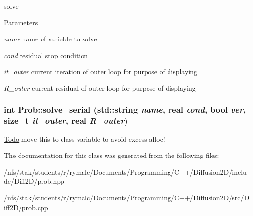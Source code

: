 solve 
\begin{DoxyParams}{Parameters}
\item[{\em name}]name of variable to solve \item[{\em cond}]residual stop condition \item[{\em it\_\-outer}]current iteration of outer loop for purpose of displaying \item[{\em R\_\-outer}]current residual of outer loop for purpose of displaying \end{DoxyParams}
\hypertarget{classProb_a19a0a17f9437a24111f11f215695a33e}{
\subsubsection[{solve\_\-serial}]{\setlength{\rightskip}{0pt plus 5cm}int Prob::solve\_\-serial (std::string {\em name}, \/  real {\em cond}, \/  bool {\em ver}, \/  size\_\-t {\em it\_\-outer}, \/  real {\em R\_\-outer})}}
\label{classProb_a19a0a17f9437a24111f11f215695a33e}


\begin{Desc}
\item[\hyperlink{todo__todo000001}{Todo}]move this to class variable to avoid excess alloc! \end{Desc}


The documentation for this class was generated from the following files:\begin{DoxyCompactItemize}
\item 
/nfs/stak/students/r/rymalc/Documents/Programming/C++/Diffusion2D/include/Diff2D/prob.hpp\item 
/nfs/stak/students/r/rymalc/Documents/Programming/C++/Diffusion2D/src/Diff2D/prob.cpp\end{DoxyCompactItemize}
